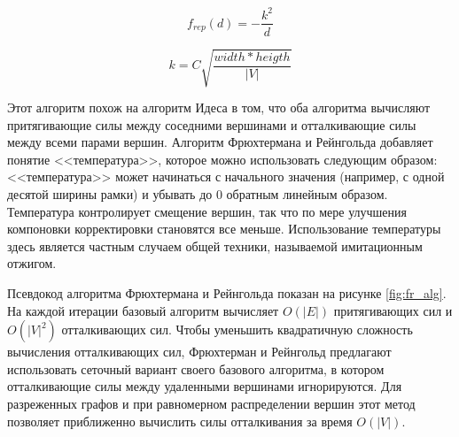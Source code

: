 \documentclass[14pt, russian]{scrartcl}
\begin{document}
\begin{equation}\label{eq:fr_repulsive}
  f_{rep}(d) = -\frac{k^2}{d}
\end{equation}

\begin{equation}\label{eq:fr_const}
  k = C \sqrt{\frac{width * heigth}{|V|}}
\end{equation} 


Этот алгоритм похож на алгоритм Идеса в том, что оба алгоритма вычисляют притягивающие силы между соседними вершинами и отталкивающие силы между всеми парами вершин.
Алгоритм Фрюхтермана и Рейнгольда добавляет понятие <<температура>>, которое можно использовать следующим образом: <<температура>> может начинаться с начального значения (например, с одной десятой ширины рамки) и убывать до 0 обратным линейным образом. Температура контролирует смещение вершин, так что по мере улучшения компоновки корректировки становятся все меньше. Использование температуры здесь является частным случаем общей техники, называемой имитационным отжигом.

Псевдокод алгоритма Фрюхтермана и Рейнгольда показан на рисунке \ref{fig:fr_alg}. На каждой итерации базовый алгоритм вычисляет $O(|E|)$ притягивающих сил и $O(|V|^2)$ отталкивающих сил. Чтобы уменьшить квадратичную сложность вычисления отталкивающих сил, Фрюхтерман и Рейнгольд предлагают использовать сеточный вариант своего базового алгоритма, в котором отталкивающие силы между удаленными вершинами игнорируются. Для разреженных графов и при равномерном распределении вершин этот метод позволяет приближенно вычислить силы отталкивания за время $O(|V|)$.
\end{document}
